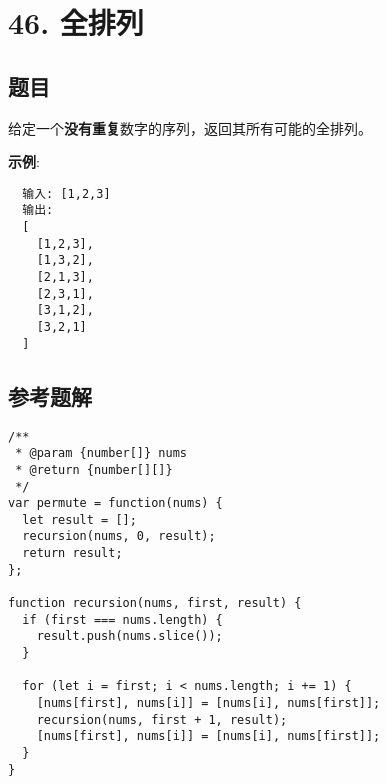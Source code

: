 \newpage
\section{46. 全排列}
\label{leetcode:46}

\subsection{题目}

给定一个\textbf{没有重复}数字的序列，返回其所有可能的全排列。

\textbf{示例}:

\begin{verbatim}
  输入: [1,2,3]
  输出:
  [
    [1,2,3],
    [1,3,2],
    [2,1,3],
    [2,3,1],
    [3,1,2],
    [3,2,1]
  ]
\end{verbatim}

\subsection{参考题解}

\begin{verbatim}
/**
 * @param {number[]} nums
 * @return {number[][]}
 */
var permute = function(nums) {
  let result = [];
  recursion(nums, 0, result);
  return result;
};

function recursion(nums, first, result) {
  if (first === nums.length) {
    result.push(nums.slice());
  }

  for (let i = first; i < nums.length; i += 1) {
    [nums[first], nums[i]] = [nums[i], nums[first]];
    recursion(nums, first + 1, result);
    [nums[first], nums[i]] = [nums[i], nums[first]];
  }
}
\end{verbatim}